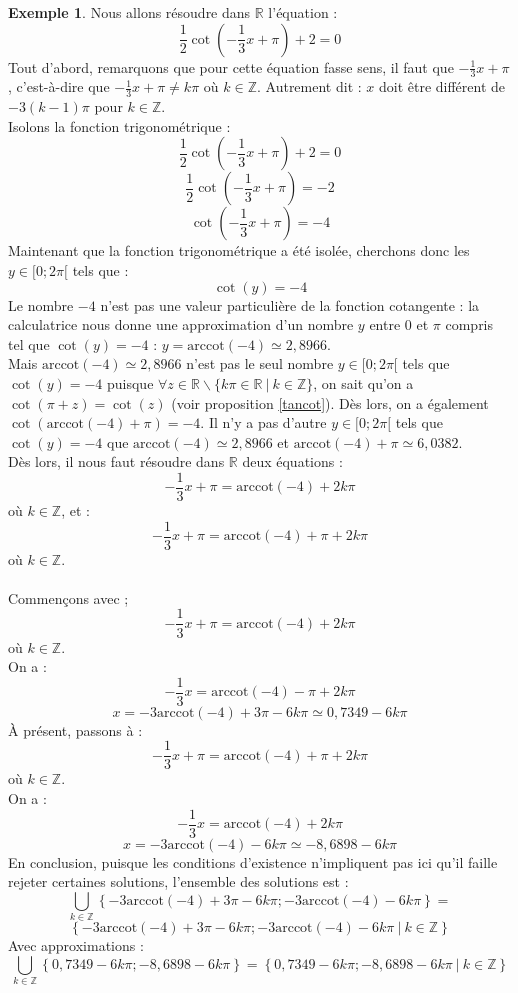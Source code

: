 \documentclass[a4paper,fontsize=13pt]{scrreprt}
\theoremstyle{plain}
\theoremstyle{definition}
\newtheorem{exe}[subsection]{Exemple}
\newcommand{\zz}{\mathbb{Z}}
\newcommand{\rr}{\mathbb{R}}
\begin{document}
\begin{exe}
Nous allons résoudre dans $\rr$ l'équation :
$$\frac{1}{2}\cot\left(-\frac{1}{3}x+\pi \right)+2=0$$
Tout d'abord, remarquons que pour cette équation fasse sens, il faut que $-\frac{1}{3}x+\pi$, c'est-à-dire que $-\frac{1}{3}x+\pi \neq k\pi$ où $k \in \zz$. Autrement dit :
$x$ doit être différent de $-3(k-1)\pi$ pour $k \in\zz$.  \\
Isolons la fonction trigonométrique :
$$\frac{1}{2}\cot\left(-\frac{1}{3}x+\pi \right)+2=0$$
$$\frac{1}{2}\cot\left(-\frac{1}{3}x+\pi \right)=-2$$
$$\cot\left(-\frac{1}{3}x+\pi \right)=-4$$
Maintenant que la fonction trigonométrique a été isolée, cherchons donc les $y \in [0;2\pi[$ tels que :
$$\cot(y)=-4$$
\newpage
Le nombre $-4$ n'est pas une valeur particulière de la fonction cotangente : la calculatrice nous donne une approximation d'un nombre $y$ entre $0$ et $\pi$ compris tel que $\cot(y)=-4$ : $y = \mathrm{arccot}(-4) \simeq 2,8966$. \\
Mais $\mathrm{arccot}(-4) \simeq 2,8966$ n'est pas le seul nombre $y \in [0;2\pi[$ tels que $\cot(y)=-4$ puisque $\forall z \in \rr \backslash \{k\pi \in \rr ~|~k \in \zz\}$, on sait qu'on a $\cot(\pi + z) = \cot(z)$ (voir proposition \ref{tancot}). Dès lors, on a également $\cot(\mathrm{arccot}(-4)+\pi)=-4$. Il n'y a pas d'autre $y \in [0;2\pi[$ tels que $\cot(y)=-4$ que $\mathrm{arccot}(-4) \simeq 2,8966$ et $\mathrm{arccot}(-4) + \pi \simeq 6,0382$. \\
Dès lors, il nous faut résoudre dans $\rr$ deux équations :
$$-\frac{1}{3}x+\pi=\mathrm{arccot}(-4)+2k\pi$$
où $k \in \zz$, et :
$$-\frac{1}{3}x+\pi=\mathrm{arccot}(-4) + \pi+2k\pi$$
où $k \in \zz$. \\
~\\
Commençons avec ;
$$-\frac{1}{3}x+\pi=\mathrm{arccot}(-4)+2k\pi$$
où $k \in \zz$. \\
On a :
$$-\frac{1}{3}x=\mathrm{arccot}(-4)-\pi+2k\pi$$
$$x=-3\mathrm{arccot}(-4)+3\pi -6k\pi \simeq 0,7349 -6k\pi$$
\`A présent, passons à :
$$-\frac{1}{3}x+\pi=\mathrm{arccot}(-4)+\pi+2k\pi$$
où $k \in \zz$. \\
On a :
$$-\frac{1}{3}x=\mathrm{arccot}(-4)+2k\pi$$
$$x=-3\mathrm{arccot}(-4)-6k\pi \simeq -8,6898 -6k\pi$$
\newpage
En conclusion, puisque les conditions d'existence n'impliquent pas ici qu'il faille rejeter certaines solutions, l'ensemble des solutions est :
$$\underset{k\in\zz}\bigcup \left\{-3\mathrm{arccot}(-4)+3\pi-6k\pi ; -3\mathrm{arccot}(-4)-6k\pi \right\} ={}$$
$$ \left\{-3\mathrm{arccot}(-4)+3\pi-6k\pi ; -3\mathrm{arccot}(-4)-6k\pi ~|~ k \in \zz \right\}$$
Avec approximations :
$$\underset{k\in\zz}\bigcup \left\{0,7349-6k\pi ; -8,6898-6k\pi \right\} = \left\{0,7349-6k\pi ; -8,6898-6k\pi ~|~ k \in \zz \right\}$$
\end{exe}
\end{document}
